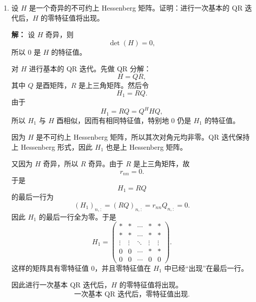 \documentclass[11pt]{article}
\renewcommand{\top}{\mathrm{T}}
\newenvironment{solution}{\par\noindent\textbf{解：}}{\par}
\begin{document}
\begin{enumerate}
\begin{solution}
\begin{enumerate}
\item 令
\[
Q=Q_0
\begin{pmatrix}
1&0\\
0&V
\end{pmatrix}.
\]
则 \(Q\) 是正交矩阵，并且
\[
Q^{\top}HQ
=
\begin{pmatrix}
1&0\\
0&V^{\top}
\end{pmatrix}
Q_0^{\top}HQ_0
\begin{pmatrix}
1&0\\
0&V
\end{pmatrix}
=
\begin{pmatrix}
\lambda&w^{\top}\\
0&H_1
\end{pmatrix},
\]
其中
\[
w^{\top}=b^{\top}V,
\]
且 \(H_1\) 是 \((n-1)\) 阶上 Hessenberg 矩阵。
\end{enumerate}

因此算法输出为
\[
\boxed{
Q=Q_0
\begin{pmatrix}
1&0\\
0&V
\end{pmatrix},
\qquad
Q^{\top}HQ=
\begin{pmatrix}
\lambda&w^{\top}\\
0&H_1
\end{pmatrix}.
}
\]
\end{solution}

\item 设 \(H\) 是一个奇异的不可约上 Hessenberg 矩阵。证明：进行一次基本的 QR 迭代后，\(H\) 的零特征值将出现。

\begin{solution}
设 \(H\) 奇异，则
\[
\det(H)=0,
\]
所以 \(0\) 是 \(H\) 的特征值。

对 \(H\) 进行基本的 QR 迭代。先做 QR 分解：
\[
H=QR,
\]
其中 \(Q\) 是酉矩阵，\(R\) 是上三角矩阵。然后令
\[
H_1=RQ.
\]
由于
\[
H_1=RQ=Q^{H}HQ,
\]
所以 \(H_1\) 与 \(H\) 酉相似，因而有相同特征值，特别地 \(0\) 仍是 \(H_1\) 的特征值。

因为 \(H\) 是不可约上 Hessenberg 矩阵，所以其次对角元均非零。QR 迭代保持上 Hessenberg 形式，因此 \(H_1\) 也是上 Hessenberg 矩阵。

又因为 \(H\) 奇异，所以 \(R\) 奇异。由于 \(R\) 是上三角矩阵，故
\[
r_{nn}=0.
\]
于是
\[
H_1=RQ
\]
的最后一行为
\[
(H_1)_{n,:}=(RQ)_{n,:}=r_{nn}Q_{n,:}=0.
\]
因此 \(H_1\) 的最后一行全为零。于是
\[
H_1=
\begin{pmatrix}
*&*&\cdots&*&*\\
*&*&\cdots&*&*\\
\vdots&\vdots&\ddots&\vdots&\vdots\\
0&0&\cdots&*&*\\
0&0&\cdots&0&0
\end{pmatrix}.
\]
这样的矩阵具有零特征值 \(0\)，并且零特征值在 \(H_1\) 中已经“出现”在最后一行。

因此进行一次基本 QR 迭代后，\(H\) 的零特征值将出现。
\[
\boxed{\text{一次基本 QR 迭代后，零特征值出现}.}
\]
\end{solution}

\end{enumerate}
\end{document}
